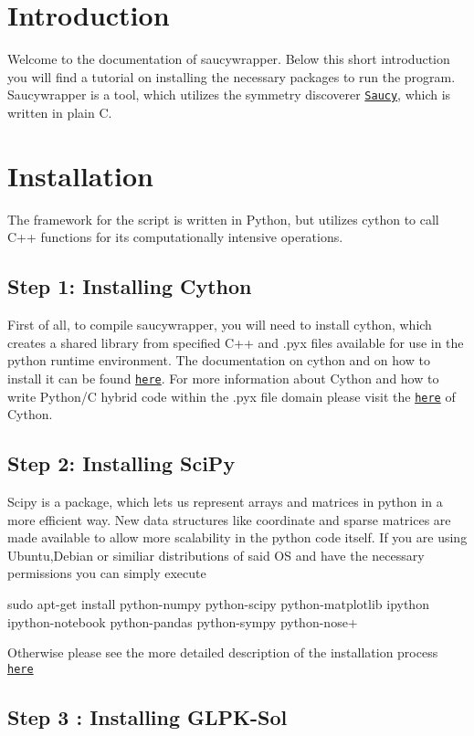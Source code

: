 \hypertarget{index_intro_sec}{}\section{Introduction}\label{index_intro_sec}
Welcome to the documentation of saucywrapper. Below this short introduction you will find a tutorial on installing the necessary packages to run the program. Saucywrapper is a tool, which utilizes the symmetry discoverer \href{http://stackoverflow.com}{\tt Saucy}, which is written in plain C. \hypertarget{index_install_sec}{}\section{Installation}\label{index_install_sec}
The framework for the script is written in Python, but utilizes cython to call C++ functions for its computationally intensive operations.\hypertarget{index_step1}{}\subsection{Step 1\-: Installing Cython}\label{index_step1}
First of all, to compile saucywrapper, you will need to install cython, which creates a shared library from specified C++ and .pyx files available for use in the python runtime environment. The documentation on cython and on how to install it can be found \href{http://docs.cython.org/src/quickstart/install.html}{\tt here}. For more information about Cython and how to write Python/\-C hybrid code within the .pyx file domain please visit the \href{cython.http://docs.cython.org/index.html}{\tt here} of Cython. \hypertarget{index_step2}{}\subsection{Step 2\-: Installing Sci\-Py}\label{index_step2}
Scipy is a package, which lets us represent arrays and matrices in python in a more efficient way. New data structures like coordinate and sparse matrices are made available to allow more scalability in the python code itself. If you are using Ubuntu,Debian or similiar distributions of said O\-S and have the necessary permissions you can simply execute 
\begin{DoxyCode}
sudo apt-\textcolor{keyword}{get} install python-numpy python-scipy python-matplotlib ipython ipython-notebook python-pandas 
      python-sympy python-nose+
\end{DoxyCode}
 Otherwise please see the more detailed description of the installation process \href{http://scipy.org/install.html}{\tt here} \hypertarget{index_step3}{}\subsection{Step 3 \-: Installing G\-L\-P\-K-\/\-Sol}\label{index_step3}

